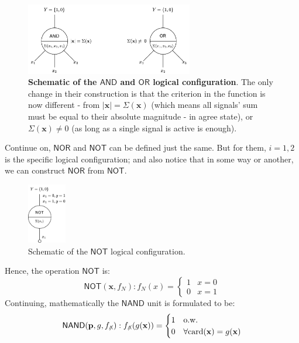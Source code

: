 \begin{figure}[htb]
    \centering
    \includegraphics[width=0.65\textwidth]{img/logic_unit_v1.png}
    \caption{\textbf{Schematic of the $\mathsf{AND}$ and $\mathsf{OR}$ logical configuration}. The only change in their construction is that the criterion in the function is now different - from $|\mathbf{x}|=\Sigma(\mathbf{x})$ (which means all signals' sum must be equal to their absolute magnitude - in agree state), or $\Sigma(\mathbf{x})\ne 0$ (as long as a single signal is active is enough).}
\end{figure}
Continue on, $\mathsf{NOR}$ and $\mathsf{NOT}$ can be defined just the same. But for them, $i=1,2$ is the specific logical configuration; and also notice that in some way or another, we can construct $\mathsf{NOR}$ from $\mathsf{NOT}$. 
\begin{figure}[htb]
    \centering
    \includegraphics[width=0.15\textwidth]{img/logic_unit_v2.png}
    \caption{Schematic of the $\mathsf{NOT}$ logical configuration.}
\end{figure}
Hence, the operation $\mathsf{NOT}$ is: 
\begin{equation}
    \mathsf{NOT}(\mathbf{x},f_{N}) : f_{N}(x) = \begin{cases}
        1 & x = 0\\
        0 & x = 1
    \end{cases}
\end{equation}
Continuing, mathematically the $\mathsf{NAND}$ unit is formulated to be: 
\begin{equation}
    \mathsf{NAND}(\mathbf{p}, g,f_{\not\land}) : f_{\not\land}(g(\mathbf{x})) = \begin{cases}
        1 & \text{o.w.}\\
        0 & \forall \mathrm{card}(\mathbf{x}) = g(\mathbf{x})
    \end{cases}
\end{equation}
